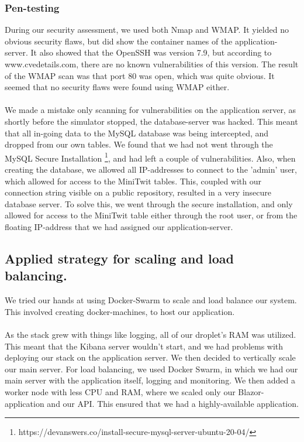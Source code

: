 \documentclass{article}
\begin{document}
\subsubsection{Pen-testing}
During our security assessment, we used both Nmap and WMAP. It yielded no obvious security flaws, but did show the container names of the application-server. It also showed that the OpenSSH was version 7.9, but according to www.cvedetails.com, there are no known vulnerabilities of this version. The result of the WMAP scan was that port 80 was open, which was quite obvious. It seemed that no security flaws were found using WMAP either.
\\\\
We made a mistake only scanning for vulnerabilities on the application server, as shortly before the simulator stopped, the database-server was hacked. This meant that all in-going data to the MySQL database was being intercepted, and dropped from our own tables. We found that we had not went through the MySQL Secure Installation \footnote{https://devanswers.co/install-secure-mysql-server-ubuntu-20-04/}, and had left a couple of vulnerabilities. Also, when creating the database, we allowed all IP-addresses to connect to the 'admin' user, which allowed for access to the MiniTwit tables. This, coupled with our connection string visible on a public repository, resulted in a very insecure database server. To solve this, we went through the secure installation, and only allowed for access to the MiniTwit table either through the root user, or from the floating IP-address that we had assigned our application-server.

\subsection{Applied strategy for scaling and load balancing.}
We tried our hands at using Docker-Swarm to scale and load balance our system. This involved creating docker-machines, to host our application.
\\\\
As the stack grew with things like logging, all of our droplet's RAM was utilized. This meant that the Kibana server wouldn't start, and we had problems with deploying our stack on the application server. We then decided to vertically scale our main server. For load balancing, we used Docker Swarm, in which we had our main server with the application itself, logging and monitoring. We then added a worker node with less CPU and RAM, where we scaled only our Blazor-application and our API. This ensured that we had a highly-available application.
\end{document}

